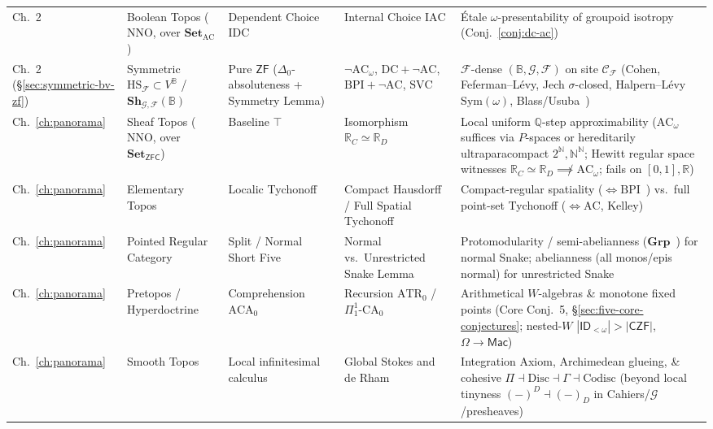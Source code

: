 \documentclass[10pt,twoside,openright]{book}
\theoremstyle{crmplain}
\theoremstyle{crmdef}
\theoremstyle{crmremark}
\newcommand{\CohesiveQuad}{\Pi \dashv \mathrm{Disc} \dashv \Gamma \dashv \mathrm{Codisc}}
\begin{document}
{\begin{xltabular}{\textwidth}{@{}P{0.11\textwidth}P{0.17\textwidth}P{0.18\textwidth}P{0.18\textwidth}Y@{}}
Ch.~2 & Boolean Topos ($\mathrm{NNO}$, over $\mathbf{Set}_{\mathrm{AC}}$) & Dependent Choice $\mathrm{IDC}$ & Internal Choice $\mathrm{IAC}$ & \'Etale $\omega$-presentability of groupoid isotropy (Conj.~\ref{conj:dc-ac}) \\
Ch.~2 (\S\ref{sec:symmetric-bv-zf}) & Symmetric $\mathrm{HS}_{\mathcal{F}} \subset V^{\mathbb{B}}$ / $\mathbf{Sh}_{\mathcal{G},\mathcal{F}}(\mathbb{B})$ & Pure $\mathsf{ZF}$ ($\Delta_0$-absoluteness + Symmetry Lemma) & $\neg\mathrm{AC}_\omega$, $\mathrm{DC}+\neg\mathrm{AC}$, $\mathrm{BPI}+\neg\mathrm{AC}$, $\mathrm{SVC}$ & $\mathcal{F}$-dense $(\mathbb{B}, \mathcal{G}, \mathcal{F})$ on site $\mathcal{C}_{\mathcal{F}}$ (Cohen, Feferman--L\'evy, Jech $\sigma$-closed, Halpern--L\'evy $\mathrm{Sym}(\omega)$, Blass/Usuba~\cite{Fourman80,Jech73,HalpernLevy71,Blass79,Usuba21}) \\
Ch.~\ref{ch:panorama} & Sheaf Topos ($\mathrm{NNO}$, over $\mathbf{Set}_{\mathsf{ZFC}}$) & Baseline $\top$ & Isomorphism $\mathbb{R}_C \simeq \mathbb{R}_D$ & Local uniform $\mathbb{Q}$-step approximability ($\mathrm{AC}_\omega$ suffices via $P$-spaces or hereditarily ultraparacompact $2^{\mathbb{N}}, \mathbb{N}^{\mathbb{N}}$; Hewitt regular space witnesses $\mathbb{R}_C \simeq \mathbb{R}_D \not\implies \mathrm{AC}_\omega$; fails on $[0,1], \mathbb{R}$) \\
Ch.~\ref{ch:panorama} & Elementary Topos & Localic Tychonoff & Compact Hausdorff / Full Spatial Tychonoff & Compact-regular spatiality ($\iff \mathrm{BPI}$~\cite{Johnstone82}) vs.\ full point-set Tychonoff ($\iff \mathrm{AC}$, Kelley) \\
Ch.~\ref{ch:panorama} & Pointed Regular Category & Split / Normal Short Five & Normal vs.\ Unrestricted Snake Lemma & Protomodularity / semi-abelianness ($\mathbf{Grp}$~\cite{Bourn91,JMT02}) for normal Snake; abelianness (all monos/epis normal) for unrestricted Snake \\
Ch.~\ref{ch:panorama} & Pretopos / Hyperdoctrine & Comprehension $\mathrm{ACA}_0$ & Recursion $\mathrm{ATR}_0$ / $\Pi^1_1\text{-}\mathrm{CA}_0$ & Arithmetical $W$-algebras \& monotone fixed points (Core Conj.~5, \S\ref{sec:five-core-conjectures}; nested-$W$ $|\mathsf{ID}_{<\omega}| > |\mathsf{CZF}|$, $\Omega \to \mathsf{Mac}$) \\
Ch.~\ref{ch:panorama} & Smooth Topos & Local infinitesimal calculus & Global Stokes and de Rham & Integration Axiom, Archimedean glueing, \& cohesive $\CohesiveQuad$ (beyond local tinyness $(-)^D \dashv (-)_D$ in Cahiers/$\mathcal{G}$/presheaves) \\

\end{xltabular}}
\end{document}
